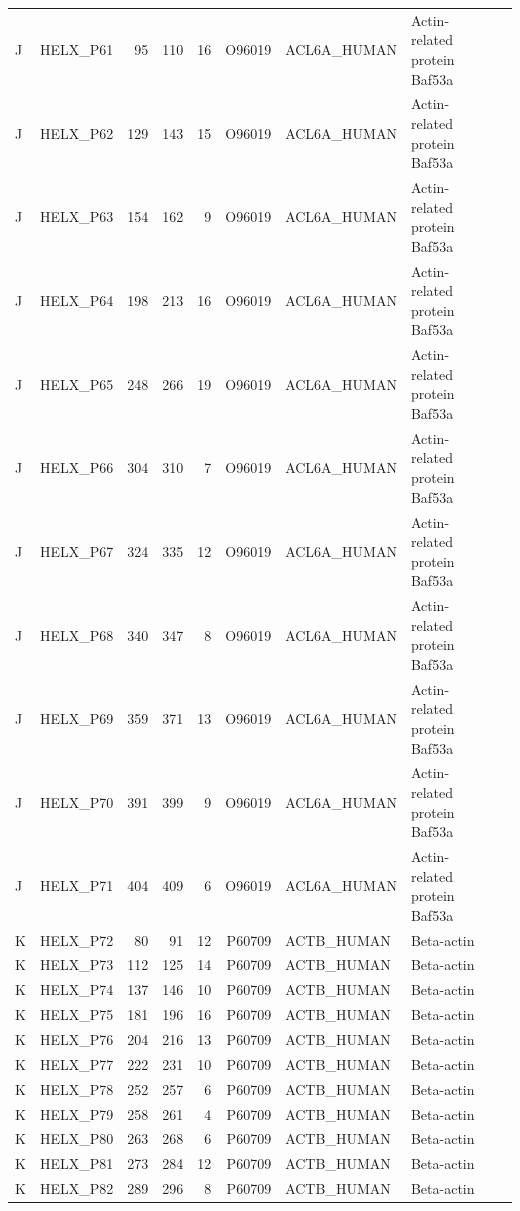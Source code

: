 \begin{longtable}{@{}llrrrrllp{5.2cm}@{}}
  J & HELX_P61 & 95 & 110 & 16 & O96019 & ACL6A_HUMAN & Actin-related protein Baf53a \\
  J & HELX_P62 & 129 & 143 & 15 & O96019 & ACL6A_HUMAN & Actin-related protein Baf53a \\
  J & HELX_P63 & 154 & 162 & 9 & O96019 & ACL6A_HUMAN & Actin-related protein Baf53a \\
  J & HELX_P64 & 198 & 213 & 16 & O96019 & ACL6A_HUMAN & Actin-related protein Baf53a \\
  J & HELX_P65 & 248 & 266 & 19 & O96019 & ACL6A_HUMAN & Actin-related protein Baf53a \\
  J & HELX_P66 & 304 & 310 & 7 & O96019 & ACL6A_HUMAN & Actin-related protein Baf53a \\
  J & HELX_P67 & 324 & 335 & 12 & O96019 & ACL6A_HUMAN & Actin-related protein Baf53a \\
  J & HELX_P68 & 340 & 347 & 8 & O96019 & ACL6A_HUMAN & Actin-related protein Baf53a \\
  J & HELX_P69 & 359 & 371 & 13 & O96019 & ACL6A_HUMAN & Actin-related protein Baf53a \\
  J & HELX_P70 & 391 & 399 & 9 & O96019 & ACL6A_HUMAN & Actin-related protein Baf53a \\
  J & HELX_P71 & 404 & 409 & 6 & O96019 & ACL6A_HUMAN & Actin-related protein Baf53a \\
  K & HELX_P72 & 80 & 91 & 12 & P60709 & ACTB_HUMAN & Beta-actin \\
  K & HELX_P73 & 112 & 125 & 14 & P60709 & ACTB_HUMAN & Beta-actin \\
  K & HELX_P74 & 137 & 146 & 10 & P60709 & ACTB_HUMAN & Beta-actin \\
  K & HELX_P75 & 181 & 196 & 16 & P60709 & ACTB_HUMAN & Beta-actin \\
  K & HELX_P76 & 204 & 216 & 13 & P60709 & ACTB_HUMAN & Beta-actin \\
  K & HELX_P77 & 222 & 231 & 10 & P60709 & ACTB_HUMAN & Beta-actin \\
  K & HELX_P78 & 252 & 257 & 6 & P60709 & ACTB_HUMAN & Beta-actin \\
  K & HELX_P79 & 258 & 261 & 4 & P60709 & ACTB_HUMAN & Beta-actin \\
  K & HELX_P80 & 263 & 268 & 6 & P60709 & ACTB_HUMAN & Beta-actin \\
  K & HELX_P81 & 273 & 284 & 12 & P60709 & ACTB_HUMAN & Beta-actin \\
  K & HELX_P82 & 289 & 296 & 8 & P60709 & ACTB_HUMAN & Beta-actin \\

\end{longtable}
